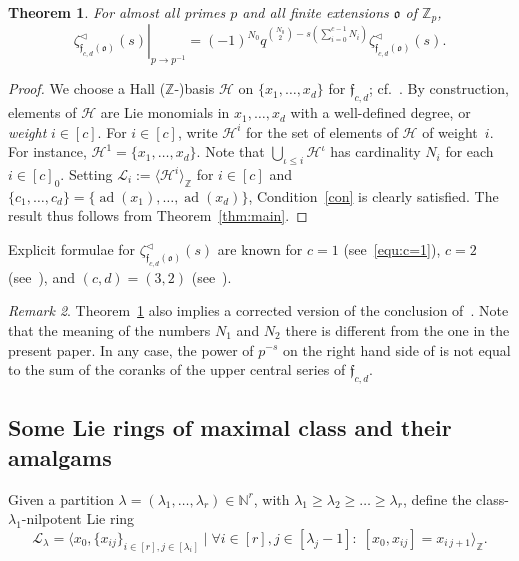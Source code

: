 \documentclass[11pt]{amsart}
\numberwithin{equation}{section}
\numberwithin{figure}{section}
\theoremstyle{plain}
\newtheorem{theorem}{Theorem}[section]
\theoremstyle{definition}
\theoremstyle{remark}
\newtheorem{remark}[theorem]{Remark}
\begin{document}
\begin{theorem}\label{thm:free} 
 For almost all primes $p$ and all finite extensions ${\mathfrak o}$ of ${\ensuremath{\mathbb{Z}_p}}$,
$$\left.\zeta^{\triangleleft}_{{\ensuremath{\mathfrak{f}}}_{c,d}({\mathfrak o})}(s) \right|_{p{\rightarrow} p^{-1}} =
(-1)^{N_0}q^{\binom{N_0}{2}-s\left(\sum_{i=0}^{c-1}N_i\right)}\zeta^{\triangleleft}_{{\ensuremath{\mathfrak{f}}}_{c,d}({\mathfrak o})}(s).$$
\end{theorem}

\begin{proof} 
 We choose a Hall (${\ensuremath{\mathbb{Z}}}$-)basis ${\mathcal{H}}$ on $\{x_1,\dots,x_d\}$ for
 ${\ensuremath{\mathfrak{f}}}_{c,d}$; cf.\ \cite{Hall/50}. By construction, elements of
 ${\mathcal{H}}$ are Lie monomials in $x_1,\dots,x_d$ with a well-defined
 degree, or \emph{weight} $i\in[c]$. For $i\in[c]$, write ${\mathcal{H}}^i$ for
 the set of elements of ${\mathcal{H}}$ of weight~$i$. For instance, ${\mathcal{H}}^1 =
 \{x_1,\dots,x_d\}$. Note that $\bigcup_{\iota\leq i}{\mathcal{H}}^\iota$ has
 cardinality $N_i$ for each $i\in[c]_0$. Setting ${\ensuremath{\mathcal{L}}}_{i}:={\langle}
 {\mathcal{H}}^i{\rangle}_{\ensuremath{\mathbb{Z}}}$ for $i\in[c]$ and $\{c_1,\dots,c_d\} =
 \{\operatorname{ad}(x_1),\dots,\operatorname{ad}(x_d)\}$, Condition~\ref{con} is clearly
 satisfied. The result thus follows from Theorem~\ref{thm:main}.
\end{proof}

Explicit formulae for $\zeta^{\triangleleft}_{{\ensuremath{\mathfrak{f}}}_{c,d}({\mathfrak o})}(s)$ are known
for $c=1$ (see~\eqref{equ:c=1}), $c=2$ (see~\cite{Voll/05a}), and
$(c,d)=(3,2)$ (see~\cite[Theorem~2.35]{duSWoodward/08}).

\begin{remark}
Theorem~\ref{thm:free} also implies a corrected version of the
conclusion of~\cite[Theorem~4.73]{duSWoodward/08}. Note that the
meaning of the numbers $N_1$ and $N_2$ there is different from the one
in the present paper. In any case, the power of $p^{-s}$ on the right
hand side of \cite[(4.45)]{duSWoodward/08} is not equal to the sum of
the coranks of the upper central series of ${\ensuremath{\mathfrak{f}}}_{c,d}$.
\end{remark}

\subsection{Some Lie rings of maximal class and their
  amalgams}\label{subsec:max.class}
Given a partition $\lambda=(\lambda_1,\dots,\lambda_r)\in{\ensuremath{\mathbb{N}}}^r$, with
$\lambda_1 \geq \lambda_2 \geq \dots \geq \lambda_r$, define the
class-$\lambda_1$-nilpotent Lie ring
$${\ensuremath{\mathcal{L}}}_{\lambda} = {\langle} x_0, \{x_{ij}\}_{i\in[r], j\in[\lambda_i]} \mid
\forall i\in[r], j\in[\lambda_j-1]:\; [x_0,x_{ij}] =
x_{i\,j+1}{\rangle}_{\ensuremath{\mathbb{Z}}}.$$
\end{document}
